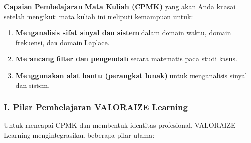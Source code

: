 \documentclass[
  letterpaper,
  DIV=11,
  numbers=noendperiod]{scrreprt}
\providecommand{\tightlist}{%
  \setlength{\itemsep}{0pt}\setlength{\parskip}{0pt}}
\begin{document}
\textbf{Capaian Pembelajaran Mata Kuliah (CPMK)} yang akan Anda kuasai
setelah mengikuti mata kuliah ini meliputi kemampuan untuk:

\begin{enumerate}
\def\labelenumi{\arabic{enumi}.}
\tightlist
\item
  \textbf{Menganalisis sifat sinyal dan sistem} dalam domain waktu,
  domain frekuensi, dan domain Laplace.
\item
  \textbf{Merancang filter dan pengendali} secara matematis pada studi
  kasus.
\item
  \textbf{Menggunakan alat bantu (perangkat lunak)} untuk menganalisis
  sinyal dan sistem.
\end{enumerate}

\subsubsection{\texorpdfstring{\textbf{I. Pilar Pembelajaran VALORAIZE
Learning}}{I. Pilar Pembelajaran VALORAIZE Learning}}\label{i.-pilar-pembelajaran-valoraize-learning}

Untuk mencapai CPMK dan membentuk identitas profesional, VALORAIZE
Learning mengintegrasikan beberapa pilar utama:
\end{document}
